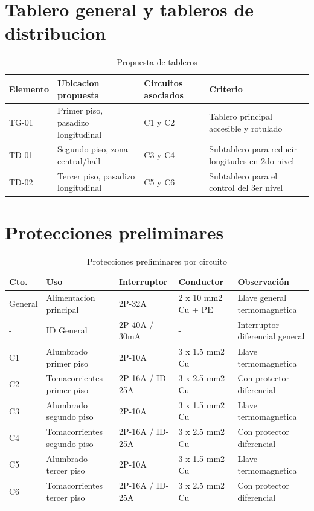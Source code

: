 \section{Tablero general y tableros de distribucion}

\begin{table}[H]
\centering
\small
\caption{Propuesta de tableros}
\label{tab:tableros-distribucion}
\begin{tabularx}{\textwidth}{L{1.8cm}L{4.0cm}L{4.2cm}Y}
\toprule
\textbf{Elemento} & \textbf{Ubicacion propuesta} & \textbf{Circuitos asociados} & \textbf{Criterio} \\
\midrule
TG-01 & Primer piso, pasadizo longitudinal & C1 y C2 & Tablero principal accesible y rotulado \\
TD-01 & Segundo piso, zona central/hall & C3 y C4 & Subtablero para reducir longitudes en 2do nivel \\
TD-02 & Tercer piso, pasadizo longitudinal & C5 y C6 & Subtablero para el control del 3er nivel \\
\bottomrule
\end{tabularx}
\end{table}

\section{Protecciones preliminares}

\begin{table}[H]
\centering
\small
\setlength{\tabcolsep}{3pt}
\caption{Protecciones preliminares por circuito}
\label{tab:protecciones-preliminares}
\begin{tabularx}{\textwidth}{l Y Y Y Y}
\toprule
\textbf{Cto.} & \textbf{Uso} & \textbf{Interruptor} & \textbf{Conductor} & \textbf{Observación} \\
\midrule
General & Alimentacion principal & 2P-32A & 2 x 10 mm2 Cu + PE & Llave general termomagnetica \\
- & ID General & 2P-40A / 30mA & - & Interruptor diferencial general \\
C1 & Alumbrado primer piso & 2P-10A & 3 x 1.5 mm2 Cu & Llave termomagnetica \\
C2 & Tomacorrientes primer piso & 2P-16A / ID-25A & 3 x 2.5 mm2 Cu & Con protector diferencial \\
C3 & Alumbrado segundo piso & 2P-10A & 3 x 1.5 mm2 Cu & Llave termomagnetica \\
C4 & Tomacorrientes segundo piso & 2P-16A / ID-25A & 3 x 2.5 mm2 Cu & Con protector diferencial \\
C5 & Alumbrado tercer piso & 2P-10A & 3 x 1.5 mm2 Cu & Llave termomagnetica \\
C6 & Tomacorrientes tercer piso & 2P-16A / ID-25A & 3 x 2.5 mm2 Cu & Con protector diferencial \\
\bottomrule
\end{tabularx}
\end{table}

